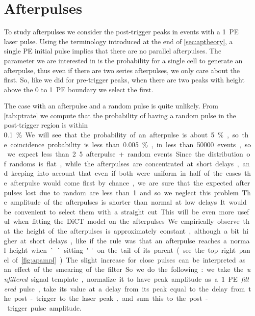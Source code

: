 \section{Afterpulses}

To study afterpulses we consider the post-trigger peaks in events with a 1~PE
laser pulse. Using the terminology introduced at the end of
\autoref{sec:aptheory}, a single PE initial pulse implies that there are no
parallel afterpulses. The parameter we are interested in is the probability for
a single cell to generate an afterpulse, thus even if there are two series
afterpulses, we only care about the first. So, like we did for pre-trigger
peaks, when there are two peaks with height above the 0 to 1~PE boundary we
select the first.

The case with an afterpulse and a random pulse is quite unlikely. From
\autoref{tab:ptrate} we compute that the probability of having a random pulse
in the post-trigger region is within \SI{0.1}\%. We will see that the
probability of an afterpulse is about \SI{5}\%, so the coincidence probability
is less than \SI{0.005}\%, in less than \num{50000} events, so we expect less
than 2.5 afterpulse+random events. Since the distribution of randoms is flat,
while the afterpulses are concentrated at short delays, and keeping into
account that even if both were uniform in half of the cases the afterpulse
would come first by chance, we are sure that the expected afterpulses lost due
to random are less than 1 and so we neglect this problem.

The amplitude of the afterpulses is shorter than normal at low delays. It would
be convenient to select them with a straight cut. This will be even more useful
when fitting the DiCT model on the afterpulses. We empirically observe that the
height of the afterpulses is approximately constant, although a bit higher at
short delays, like if the rule was that an afterpulse reaches a normal height
when ``sitting'' on the tail of its parent (see the top right panel of
\autoref{fig:apampl}). The slight increase for close pulses can be interpreted
as an effect of the smearing of the filter. So we do the following: we take the
\emph{unfiltered} signal template, normalize it to have peak amplitude as a
1~PE \emph{filtered} pulse, take its value at a delay from its peak equal to
the delay from the post-trigger to the laser peak, and sum this to the
post-trigger pulse amplitude.

